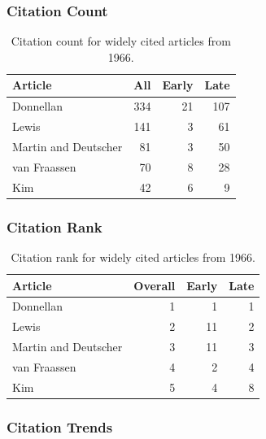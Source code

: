 \documentclass[
  10pt,
  letterpaper,
  DIV=11,
  numbers=noendperiod,
  twoside]{scrartcl}
\begin{document}
\subsubsection*{Citation Count}\label{sec-count-1966}

\begin{longtable}[]{@{}lrrr@{}}

\caption{\label{tbl-citation-count-1966}Citation count for widely cited
articles from 1966.}

\tabularnewline

\toprule\noalign{}
Article & All & Early & Late \\
\midrule\noalign{}
\endhead
\bottomrule\noalign{}
\endlastfoot
Donnellan & 334 & 21 & 107 \\
Lewis & 141 & 3 & 61 \\
Martin and Deutscher & 81 & 3 & 50 \\
van Fraassen & 70 & 8 & 28 \\
Kim & 42 & 6 & 9 \\

\end{longtable}

\subsubsection*{Citation Rank}\label{sec-rank-1966}

\begin{longtable}[]{@{}lrrr@{}}

\caption{\label{tbl-citation-rank-1966}Citation rank for widely cited
articles from 1966.}

\tabularnewline

\toprule\noalign{}
Article & Overall & Early & Late \\
\midrule\noalign{}
\endhead
\bottomrule\noalign{}
\endlastfoot
Donnellan & 1 & 1 & 1 \\
Lewis & 2 & 11 & 2 \\
Martin and Deutscher & 3 & 11 & 3 \\
van Fraassen & 4 & 2 & 4 \\
Kim & 5 & 4 & 8 \\

\end{longtable}

\subsubsection*{Citation Trends}\label{sec-trends-1966}
\end{document}
